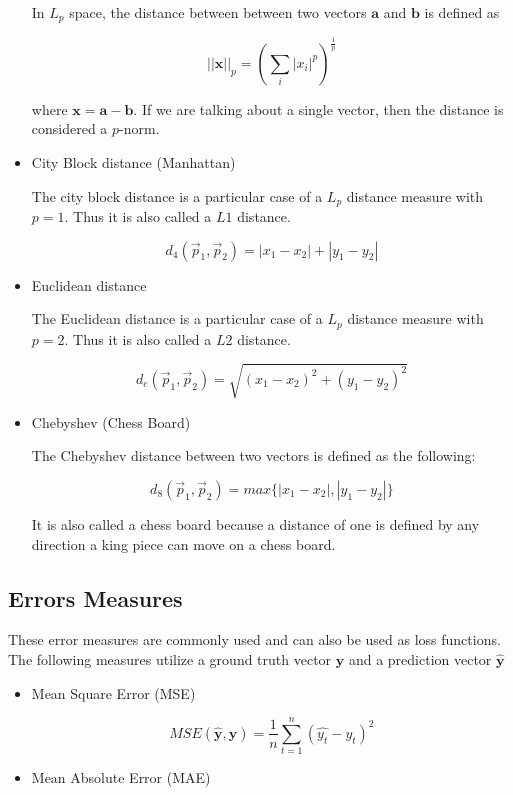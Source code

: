 \documentclass{article}
\begin{document}
\begin{multicols}{2}
\begin{itemize}
In $L_p$ space, the distance between between two vectors $\mathbf{a}$ and $\mathbf{b}$ is defined as

$$
||\mathbf{x}||_p = \left(\sum_{i} | x_i |^p \right)^{\frac{1}{p}}
$$

where $\mathbf{x} = \mathbf{a} - \mathbf{b}$. If we are talking about a single vector, then the distance is considered a $p$-norm.

\item City Block distance (Manhattan)

The city block distance is a particular case of a $L_p$ distance measure with $p=1$. Thus it is also called a $L1$ distance.

$$
d_4(\vec p_1, \vec p_2) = | x_1 - x_2 | + | y_1 - y_2 |
$$

\item Euclidean distance

The Euclidean distance is a particular case of a $L_p$ distance measure with $p=2$. Thus it is also called a $L2$ distance.

$$
d_e(\vec p_1, \vec p_2) = \sqrt{(x_1 - x_2)^2 + (y_1 - y_2)^2}
$$

\item Chebyshev (Chess Board)

The Chebyshev distance between two vectors is defined as the following:

$$
d_8(\vec p_1, \vec p_2) = max\{| x_1 - x_2 |, | y_1 - y_2 |\}
$$

It is also called a chess board because a distance of one is defined by any direction a king piece can move on a chess board.

\end{itemize}

\subsection{Errors Measures}

These error measures are commonly used and can also be used as loss functions. The following measures utilize a ground truth vector $\mathbf{y}$ and a prediction vector $\mathbf{\hat y}$

\begin{itemize}
\item Mean Square Error (MSE)

$$
MSE(\mathbf{\hat y}, \mathbf{y}) = \frac{1}{n}\sum_{t=1}^n (\hat{y_t} - y_t)^2
$$

\item Mean Absolute Error (MAE)


\end{itemize}
\end{multicols}
\end{document}
